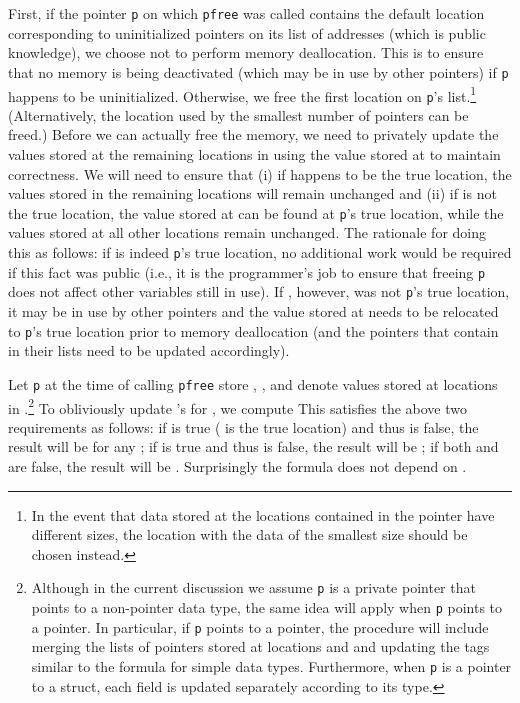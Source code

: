 \documentclass[11pt]{article}
\begin{document}
First, if the pointer \texttt{p} on which \texttt{pfree} was called contains
the default location corresponding to uninitialized pointers on its list of
addresses  (which is public knowledge), we choose not to perform memory
deallocation. This is to ensure that no memory is being deactivated (which
may be in use by other pointers) if \texttt{p} happens to be uninitialized.
Otherwise, we free the first location  on \texttt{p}'s
list.\footnote{In the event that data stored at the locations contained in
the pointer have different sizes, the location with the data of the smallest
size should be chosen instead.} (Alternatively, the location used by the
smallest number of pointers can be freed.) Before we can actually free the
memory, we need to privately update the values stored at the remaining
locations in  using the value stored at  to maintain correctness.
We will need to ensure that (i) if  happens to be the true location,
the values stored in the remaining locations will remain unchanged and (ii)
if  is not the true location, the value stored at  can be
found at \texttt{p}'s true location, while the values stored at all other
locations remain unchanged.  The rationale for doing this as follows: if
 is indeed \texttt{p}'s true location, no additional work would be
required if this fact was public (i.e., it is the programmer's job to ensure
that freeing \texttt{p} does not affect other variables still in use). If
, however, was not \texttt{p}'s true location, it may be in use by
other pointers and the value stored at  needs to be relocated to
\texttt{p}'s true location prior to memory deallocation (and the pointers
that contain  in their lists need to be updated accordingly).

Let \texttt{p} at the time of calling \texttt{pfree} store , ,  and  denote values
stored at locations in .\footnote{Although in the current discussion we
assume \texttt{p} is a private pointer that points to a non-pointer data
type, the same idea will apply when \texttt{p} points to a pointer. In
particular, if \texttt{p} points to a pointer, the procedure will include
merging the lists of pointers stored at locations  and  and
updating the tags similar to the formula for simple data types. Furthermore,
when \texttt{p} is a pointer to a struct, each field is updated separately
according to its type.} To obliviously update 's for , we compute  
This satisfies the above two requirements as follows: if  is true
( is the true location) and thus  is false, the result will be
 for any ; if  is true and thus  is false, the result will
be ; if both  and  are false, the result will be .
Surprisingly the formula does not depend on .
\end{document}

